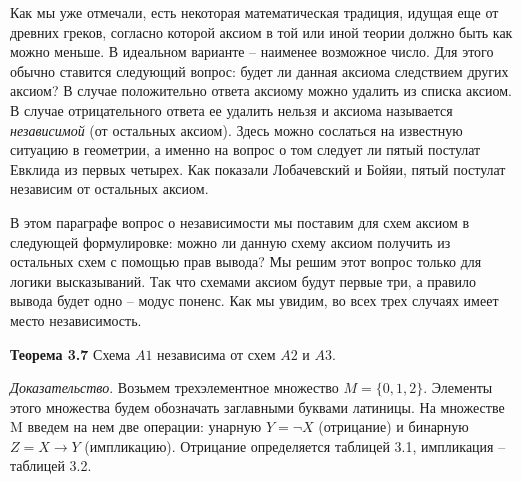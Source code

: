 \documentclass[a4paper]{article}
\begin{document}
Как мы уже отмечали, есть некоторая математическая традиция, идущая еще от древних греков, согласно которой аксиом в той или иной теории должно быть как можно меньше. В идеальном варианте -- наименее возможное число. Для этого обычно ставится следующий вопрос: будет ли данная аксиома следствием других аксиом? В случае положительно ответа аксиому можно удалить из списка аксиом. В случае отрицательного ответа ее удалить нельзя и аксиома называется \textit{независимой} (от остальных аксиом). Здесь можно сослаться на известную ситуацию в геометрии, а именно на вопрос о том следует ли пятый постулат Евклида из первых четырех. Как показали Лобачевский и Бойяи, пятый постулат независим от остальных аксиом.


В этом параграфе вопрос о независимости мы поставим для схем аксиом в следующей формулировке: можно ли данную схему аксиом получить из остальных схем с помощью прав вывода? Мы решим этот вопрос только для логики высказываний. Так что схемами аксиом будут первые три, а правило вывода будет одно -- модус поненс. Как мы увидим, во всех трех случаях имеет место независимость.

\textbf{Теорема 3.7} Схема $A1$ независима от схем $A2$ и $A3$.

\textit{Доказательство}. Возьмем трехэлементное множество $M = \{0, 1, 2\}$. Элементы этого множества будем обозначать заглавными буквами латиницы. На множестве M введем на нем две операции: унарную $Y = \neg X$ (отрицание) и бинарную $Z = X \rightarrow Y$ (импликацию). Отрицание определяется таблицей 3.1, импликация – таблицей 3.2.
\end{document}
